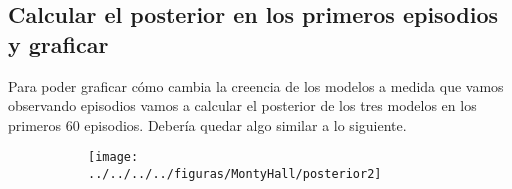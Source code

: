 \documentclass[a4paper,10pt]{article}
\begin{document}
%

\subsection{Calcular el posterior en los primeros episodios y graficar}

Para poder graficar cómo cambia la creencia de los modelos a medida que vamos observando episodios vamos a calcular el posterior de los tres modelos en los primeros 60 episodios.
Debería quedar algo similar a lo siguiente.

 \begin{figure}[H] \centering
\begin{subfigure}[t]{0.48\textwidth}
\texttt{[image: ../../../../figuras/MontyHall/posterior2]}
\end{subfigure}
\end{figure}
\end{document}
